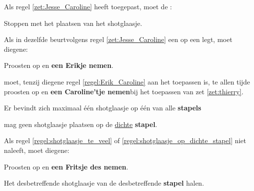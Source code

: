 \vervolgLijst{}
\item \label{zet:Jesse_Caroline_2} Als \eenSpeler regel \ref{zet:Jesse_Caroline} heeft toegepast, moet de \huidigeSpelerN:
\puntLijst{}
\item Stoppen met het plaatsen van het shotglaasje.
\eindPuntLijst{}
\eindLijst{}

\vervolgLijst{}
\item \label{regel:Erik_Caroline} Als \eenSpeler in dezelfde beurt\footnotemark[7] volgens regel \ref{zet:Jesse_Caroline} een \footnotemark[5] op een \footnotemark[6] legt, moet diegene:
\puntLijst{}
\item Proosten op  en \textbf{een Erikje nemen}\footnotemark[8].
\eindPuntLijst{}
\eindLijst{}

\vervolgLijst{}
\item \label{regel:Erik_Caroline_2} \EenSpeler moet, tenzij diegene regel \ref{regel:Erik_Caroline} aan het toepassen is, te allen tijde proosten op  en \textbf{een Caroline’tje nemen}\footnotemark[8] bij het toepassen van zet \ref{zet:thierry}\footnotemark[1].
\eindLijst{}


\vervolgLijst{}
\item \label{regel:caroline_een_shotglaasje} Er bevindt zich maximaal \'e\'en shotglaasje op \'e\'en van alle \textbf{stapels}
\label{regel:shotglaasje_te_veel}
\eindLijst{}

\vervolgLijst{}
\item \label{regel:caroline_onjuist_plaatsen_1} \EenSpeler mag geen shotglaasje plaatsen op de \ul{dichte} \textbf{stapel}.
\label{regel:shotglaasje_op_dichte_stapel}
\eindLijst{}


\vervolgLijst{}
\item Als \eenSpeler regel \ref{regel:shotglaasje_te_veel} of \ref{regel:shotglaasje_op_dichte_stapel} niet naleeft, moet diegene:
\puntLijst{}
\item Proosten op  en \textbf{een Fritsje des nemen}\footnotemark[4].
\item Het desbetreffende shotglaasje van de desbetreffende \textbf{stapel} halen.
\eindPuntLijst{}
\eindLijst{}



